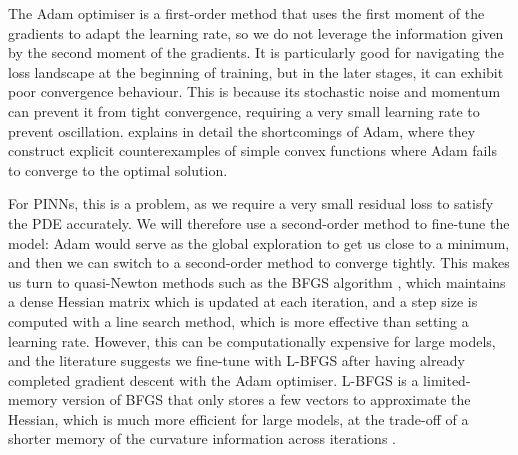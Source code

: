 The Adam optimiser is a first-order method that uses the first moment of the gradients to adapt the learning rate, so we do not leverage the information given by the second moment of the gradients. It is particularly good for navigating the loss landscape at the beginning of training, but in the later stages, it can exhibit poor convergence behaviour. This is because its stochastic noise and momentum can prevent it from tight convergence, requiring a very small learning rate to prevent oscillation. \cite{reddi2019convergence} explains in detail the shortcomings of Adam, where they construct explicit counterexamples of simple convex functions where Adam fails to converge to the optimal solution.

For PINNs, this is a problem, as we require a very small residual loss to satisfy the PDE accurately. We will therefore use a second-order method to fine-tune the model: Adam would serve as the global exploration to get us close to a minimum, and then we can switch to a second-order method to converge tightly. This makes us turn to quasi-Newton methods such as the BFGS algorithm \cite{nocedal2006numerical}, which maintains a dense Hessian matrix which is updated at each iteration, and a step size is computed with a line search method, which is more effective than setting a learning rate. However, this can be computationally expensive for large models, and the literature suggests we fine-tune with L-BFGS \cite{markidis2021old} after having already completed gradient descent with the Adam optimiser. L-BFGS is a limited-memory version of BFGS that only stores a few vectors to approximate the Hessian, which is much more efficient for large models, at the trade-off of a shorter memory of the curvature information across iterations \cite{liu1989limited}.
